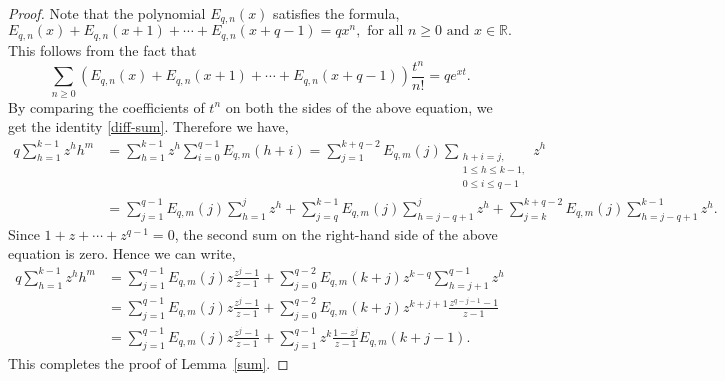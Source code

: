 \documentclass[10pt,a4paper]{amsart}
\newcommand{\R}{{\mathbb R}}
\newcommand{\lemref}[1]{Lemma~\ref{#1}}
\begin{document}
\begin{proof}
 Note that the polynomial $E_{q,n}(x)$ satisfies the formula,
\begin{equation}\label{diff-sum}
E_{q,n}(x)+E_{q,n}(x+1)+\cdots+E_{q,n}(x+q-1)=qx^n, \text{\ \ \ for all $n\geq 0$ and $x\in \R$.}
\end{equation}
This follows from the fact that
$$
\sum_{n\ge 0}\left(E_{q,n}(x)+E_{q,n}(x+1)+\cdots+E_{q,n}(x+q-1)\right)\frac{t^n}{n!}=qe^{xt}.
$$
By comparing the coefficients of $t^n$ on both the sides of the above equation, we get the identity \eqref{diff-sum}. 
Therefore we have,
\begin{align*}
q\sum_{h=1}^{k-1}z^{h}h^m&=\sum_{h=1}^{k-1}z^h\sum_{i=0}^{q-1}E_{q,m}(h+i)=\sum_{j=1}^{k+q-2}E_{q,m}(j)
\sum_{\substack{h+i=j, \\1\leq h\leq k-1,\\ 0\leq i\leq q-1}}z^h\\                                         
&=\sum_{j=1}^{q-1}E_{q,m}(j)\sum_{h=1}^{j}z^h+\sum_{j=q}^{k-1}E_{q,m}(j)\sum_{h=j-q+1}^{j}z^h+ \sum_{j=k}^{k+q-2}E_{q,m}(j)\sum_{h=j-q+1}^{k-1}z^h.
\end{align*}
Since $1+z+\cdots+z^{q-1}=0$, the second sum on the right-hand side of the above equation is zero. Hence we can write,
\begin{align*}                                            
 q\sum_{h=1}^{k-1}z^{h}h^m&=\sum_{j=1}^{q-1}E_{q,m}(j)z\frac{z^{j}-1}{z-1}+\sum_{j=0}^{q-2}E_{q,m}(k+j)z^{k-q}\sum_{h=j+1}^{q-1}z^h\\
 &=\sum_{j=1}^{q-1}E_{q,m}(j)z\frac{z^{j}-1}{z-1}+\sum_{j=0}^{q-2}E_{q,m}(k+j)z^{k+j+1}\frac{z^{q-j-1}-1}{z-1}\\
 &=\sum_{j=1}^{q-1}E_{q,m}(j)z\frac{z^{j}-1}{z-1}+\sum_{j=1}^{q-1}z^k\frac{1-z^{j}}{z-1}E_{q,m}(k+j-1).
\end{align*}
This completes the proof of \lemref{sum}.
\end{proof}
\end{document}
